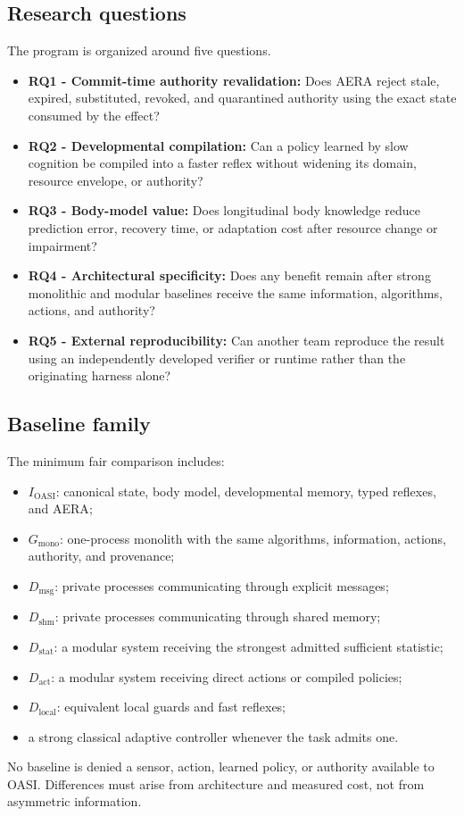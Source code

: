 \documentclass[journal,10pt]{IEEEtran}
\newcommand{\OASI}{\textsc{OASI}}
\newcommand{\AERA}{\textsc{AERA}}
\begin{document}
\subsection{Research questions}
The program is organized around five questions.
\begin{itemize}
  \item \textbf{RQ1 - Commit-time authority revalidation:} Does \AERA{} reject stale, expired, substituted, revoked, and quarantined authority using the exact state consumed by the effect?
  \item \textbf{RQ2 - Developmental compilation:} Can a policy learned by slow cognition be compiled into a faster reflex without widening its domain, resource envelope, or authority?
  \item \textbf{RQ3 - Body-model value:} Does longitudinal body knowledge reduce prediction error, recovery time, or adaptation cost after resource change or impairment?
  \item \textbf{RQ4 - Architectural specificity:} Does any benefit remain after strong monolithic and modular baselines receive the same information, algorithms, actions, and authority?
  \item \textbf{RQ5 - External reproducibility:} Can another team reproduce the result using an independently developed verifier or runtime rather than the originating harness alone?
\end{itemize}

\subsection{Baseline family}
The minimum fair comparison includes:
\begin{itemize}
  \item $I_{\mathrm{OASI}}$: canonical state, body model, developmental memory, typed reflexes, and \AERA;
  \item $G_{\mathrm{mono}}$: one-process monolith with the same algorithms, information, actions, authority, and provenance;
  \item $D_{\mathrm{msg}}$: private processes communicating through explicit messages;
  \item $D_{\mathrm{shm}}$: private processes communicating through shared memory;
  \item $D_{\mathrm{stat}}$: a modular system receiving the strongest admitted sufficient statistic;
  \item $D_{\mathrm{act}}$: a modular system receiving direct actions or compiled policies;
  \item $D_{\mathrm{local}}$: equivalent local guards and fast reflexes;
  \item a strong classical adaptive controller whenever the task admits one.
\end{itemize}
No baseline is denied a sensor, action, learned policy, or authority available to \OASI{}. Differences must arise from architecture and measured cost, not from asymmetric information.
\end{document}
